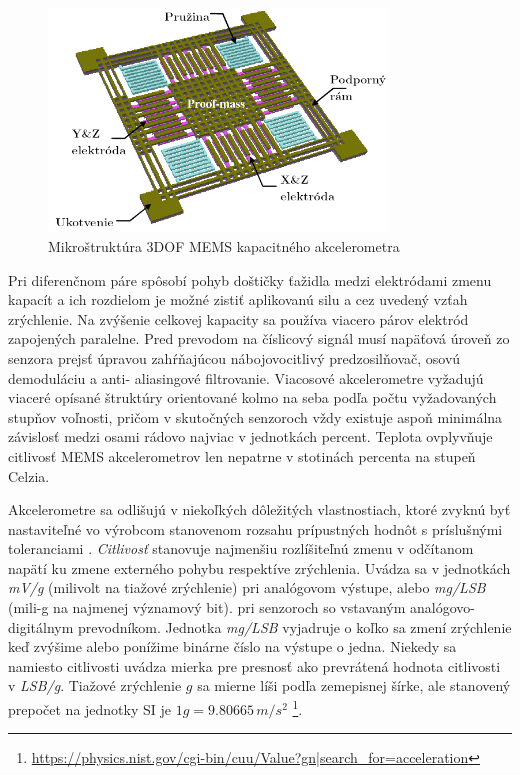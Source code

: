 \begin{figure}[h]
	\centering
	\includegraphics[width=0.8\textwidth]{figures/mems-accelerometer.png}
	\caption{Mikroštruktúra 3DOF MEMS kapacitného akcelerometra}
\end{figure}

Pri diferenčnom páre spôsobí pohyb doštičky ťažidla medzi elektródami zmenu kapacít a ich rozdielom je možné zistiť aplikovanú silu a 
cez uvedený vzťah zrýchlenie. Na zvýšenie celkovej kapacity sa používa viacero párov elektród zapojených paralelne. Pred prevodom na 
číslicový signál musí napäťová úroveň zo senzora prejsť úpravou zahŕňajúcou nábojovocitlivý predzosilňovač, osovú demoduláciu a anti-
aliasingové filtrovanie. Viacosové akcelerometre vyžadujú viaceré opísané štruktúry orientované kolmo na seba podľa počtu vyžadovaných 
stupňov voľnosti, pričom v skutočných senzoroch vždy existuje aspoň minimálna závislosť medzi osami rádovo najviac v jednotkách 
percent. Teplota ovplyvňuje citlivosť MEMS akcelerometrov len nepatrne v stotinách percenta na stupeň Celzia.

Akcelerometre sa odlišujú v niekoľkých dôležitých vlastnostiach, ktoré zvyknú byť nastaviteľné vo výrobcom stanovenom rozsahu 
prípustných hodnôt s príslušnými toleranciami \cite{accelerometer-mechanics}. 
\emph{Citlivosť} stanovuje najmenšiu rozlíšiteľnú zmenu v odčítanom napätí ku zmene externého pohybu respektíve zrýchlenia.
Uvádza sa v jednotkách \emph{mV/g} (milivolt na tiažové zrýchlenie) pri analógovom výstupe, alebo \emph{mg/LSB} (mili-g 
na najmenej významový bit). pri senzoroch so vstavaným analógovo-digitálnym prevodníkom. Jednotka \emph{mg/LSB} vyjadruje 
o koľko sa zmení zrýchlenie keď zvýšime alebo ponížime binárne číslo na výstupe o jedna. Niekedy sa namiesto 
citlivosti uvádza mierka pre presnosť ako prevrátená hodnota citlivosti v \emph{LSB/g}. Tiažové zrýchlenie $g$ sa mierne líši podľa 
zemepisnej šírke, ale stanovený prepočet na jednotky SI je $1 g = 9.80665\,m/s^2$ 
\footnote{\url{https://physics.nist.gov/cgi-bin/cuu/Value?gn|search_for=acceleration}}. 

